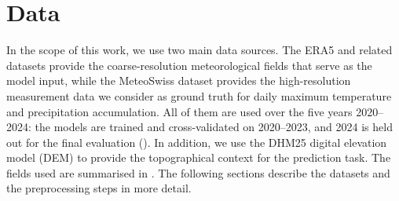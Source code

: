 \chapter{Data}\label{ch:data}

In the scope of this work, we use two main data sources. The ERA5 and related datasets provide the coarse-resolution meteorological fields that serve as the model input, while the MeteoSwiss dataset provides the high-resolution measurement data we consider as ground truth for daily maximum temperature and precipitation accumulation. All of them are used over the five years 2020--2024: the models are trained and cross-validated on 2020--2023, and 2024 is held out for the final evaluation (). In addition, we use the DHM25 digital elevation model (DEM) to provide the topographical context for the prediction task. The fields used are summarised in . The following sections describe the datasets and the preprocessing steps in more detail.

